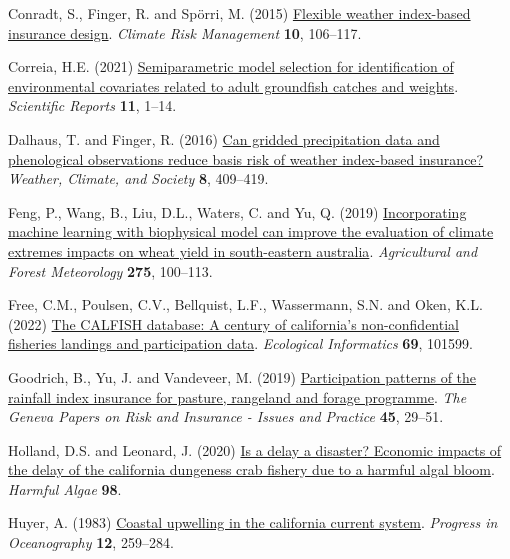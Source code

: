 \documentclass[
  letterpaper,
  DIV=11,
  numbers=noendperiod]{scrartcl}
\newlength{\cslhangindent}
\newlength{\cslentryspacingunit} %
\newenvironment{CSLReferences}[2] %
 {%
  \setlength{\parindent}{0pt}
  \ifodd #1
  \let\oldpar\par
  \def\par{\hangindent=\cslhangindent\oldpar}
  \fi
  \setlength{\parskip}{#2\cslentryspacingunit}
 }%
 {}
\begin{document}
\begin{CSLReferences}{1}{0}
\leavevmode{}%
Conradt, S., Finger, R. and Spörri, M. (2015)
\href{https://doi.org/10.1016/j.crm.2015.06.003}{Flexible weather
index-based insurance design}. \emph{Climate Risk Management}
\textbf{10}, 106--117.

\leavevmode{}%
Correia, H.E. (2021)
\href{https://doi.org/10.1038/s41598-021-89398-8}{Semiparametric model
selection for identification of environmental covariates related to
adult groundfish catches and weights}. \emph{Scientific Reports}
\textbf{11}, 1--14.

\leavevmode{}%
Dalhaus, T. and Finger, R. (2016)
\href{https://doi.org/10.1175/WCAS-D-16-0020.1}{Can gridded
precipitation data and phenological observations reduce basis risk of
weather index-based insurance?} \emph{Weather, Climate, and Society}
\textbf{8}, 409--419.

\leavevmode{}%
Feng, P., Wang, B., Liu, D.L., Waters, C. and Yu, Q. (2019)
\href{https://doi.org/10.1016/j.agrformet.2019.05.018}{Incorporating
machine learning with biophysical model can improve the evaluation of
climate extremes impacts on wheat yield in south-eastern australia}.
\emph{Agricultural and Forest Meteorology} \textbf{275}, 100--113.

\leavevmode{}%
Free, C.M., Poulsen, C.V., Bellquist, L.F., Wassermann, S.N. and Oken,
K.L. (2022) \href{https://doi.org/10.1016/j.ecoinf.2022.101599}{The
CALFISH database: A century of california's non-confidential fisheries
landings and participation data}. \emph{Ecological Informatics}
\textbf{69}, 101599.

\leavevmode{}%
Goodrich, B., Yu, J. and Vandeveer, M. (2019)
\href{https://doi.org/10.1057/s41288-019-00149-3}{Participation patterns
of the rainfall index insurance for pasture, rangeland and forage
programme}. \emph{The Geneva Papers on Risk and Insurance - Issues and
Practice} \textbf{45}, 29--51.

\leavevmode{}%
Holland, D.S. and Leonard, J. (2020)
\href{https://doi.org/10.1016/j.hal.2020.101904}{Is a delay a disaster?
Economic impacts of the delay of the california dungeness crab fishery
due to a harmful algal bloom}. \emph{Harmful Algae} \textbf{98}.

\leavevmode{}%
Huyer, A. (1983)
\href{https://doi.org/10.1016/0079-6611(83)90010-1}{Coastal upwelling in
the california current system}. \emph{Progress in Oceanography}
\textbf{12}, 259--284.


\end{CSLReferences}
\end{document}

